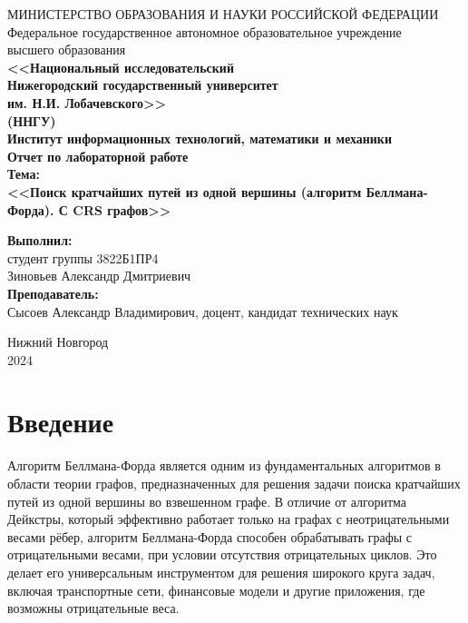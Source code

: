 \documentclass[12pt]{article}
\begin{document}
\begin{center} 
МИНИСТЕРСТВО ОБРАЗОВАНИЯ И НАУКИ РОССИЙСКОЙ ФЕДЕРАЦИИ \\
Федеральное государственное автономное образовательное учреждение  \\
высшего образования\\ \textbf{<<Национальный исследовательский \\ Нижегородский государственный университет \\
им. Н.И. Лобачевского>>}\\
\textbf{(ННГУ)}\\[0.5cm]
\textbf{Институт информационных технологий, математики и механики}\\[4.5cm]

\textbf{\large Отчет по лабораторной работе} \\[0.6cm] %
\textbf{Тема:}\\
  \textbf{\large <<Поиск кратчайших путей из одной вершины (алгоритм Беллмана-Форда). С CRS графов>>}\\[5.0cm]
\begin{flushright}
 \begin{minipage}{0.40\textwidth} %
 \begin{flushleft} %
  \textbf{Выполнил:}\\[0.1cm]
  студент группы 3822Б1ПР4 \\
  Зиновьев Александр Дмитриевич  \\[1.0cm]
  \textbf{Преподаватель:}\\[0.1cm]
  Сысоев Александр Владимирович, доцент, кандидат технических наук  \\
 \end{flushleft} %
 \end{minipage} %
\end{flushright}
 \vfill 

  Нижний Новгород \\
 2024

 \thispagestyle{empty} 

\end{center}

\newpage
\section*{Введение}
\indent Алгоритм Беллмана-Форда является одним из фундаментальных алгоритмов в области теории графов, предназначенных для решения задачи поиска кратчайших путей из одной вершины во взвешенном графе. В отличие от алгоритма Дейкстры, который эффективно работает только на графах с неотрицательными весами рёбер, алгоритм Беллмана-Форда способен обрабатывать графы с отрицательными весами, при условии отсутствия отрицательных циклов. Это делает его универсальным инструментом для решения широкого круга задач, включая транспортные сети, финансовые модели и другие приложения, где возможны отрицательные веса.
\end{document}
